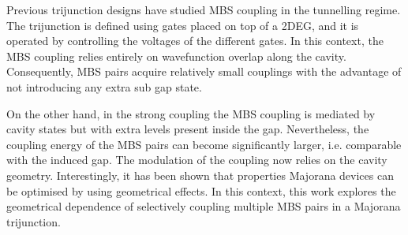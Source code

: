 Previous trijunction designs\cite{Hell2016} have studied MBS coupling in the tunnelling regime.
The trijunction is defined using gates placed on top of a 2DEG, and it is operated by controlling the voltages of the different gates.
In this context, the MBS coupling relies entirely on wavefunction overlap along the cavity. 
Consequently, MBS pairs acquire relatively small couplings with the advantage of not introducing any extra sub gap state.

On the other hand, in the strong coupling the MBS coupling is mediated by cavity states but with extra levels present inside the gap.
Nevertheless, the coupling energy of the MBS pairs can become significantly larger, i.e. comparable with the induced gap.
The modulation of the coupling now relies on the cavity geometry.
Interestingly, it has been shown that properties Majorana devices can be optimised by using geometrical effects.
In this context, this work explores the geometrical dependence of selectively coupling multiple MBS pairs in a Majorana trijunction.






